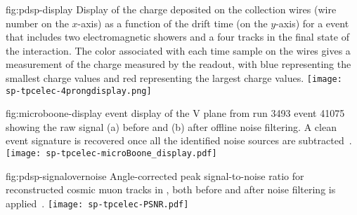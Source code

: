 \begin{dunefigure}
{fig:pdsp-display}
{Display of the charge deposited on the collection wires (wire number on the $x$-axis) as
a function of the drift time (on the $y$-axis) for a  event 
that includes two electromagnetic showers and a four tracks in the
final state of the interaction.
The color associated with each time sample on the 
wires gives a measurement of the charge measured by the 
readout, with blue representing the smallest charge values and
red representing the largest charge values.}
\texttt{[image: sp-tpcelec-4prongdisplay.png]}
\end{dunefigure}

\begin{dunefigure}
{fig:microboone-display}
{ \twod event display of the V plane from run 3493 
event 41075 showing the raw signal (a) before and (b) after offline 
noise filtering. A clean event signature is recovered once all the 
identified noise sources are subtracted~\cite{Acciarri:2017sde}.}
\texttt{[image: sp-tpcelec-microBoone\_display.pdf]}
\end{dunefigure}


\begin{dunefigure}
{fig:pdsp-signalovernoise}
{Angle-corrected peak signal-to-noise ratio for reconstructed cosmic muon tracks in
 , both before and after noise filtering is applied~\cite{pend_PDSP_PerfPaper}.}
\texttt{[image: sp-tpcelec-PSNR.pdf]}
\end{dunefigure}

